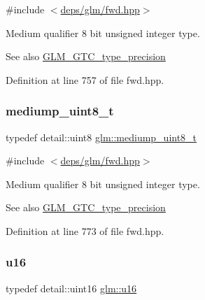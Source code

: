 {\ttfamily \#include $<$\hyperlink{fwd_8hpp}{deps/glm/fwd.\+hpp}$>$}

Medium qualifier 8 bit unsigned integer type. \begin{DoxySeeAlso}{See also}
\hyperlink{group__gtc__type__precision}{G\+L\+M\+\_\+\+G\+T\+C\+\_\+type\+\_\+precision} 
\end{DoxySeeAlso}


Definition at line 757 of file fwd.\+hpp.

\mbox{\label{group__gtc__type__precision_gadfa38f3c245d371c4b2079f1fd68928b}} 
\subsubsection{\texorpdfstring{mediump\+\_\+uint8\+\_\+t}{mediump\_uint8\_t}}
{\footnotesize\ttfamily typedef detail\+::uint8 \hyperlink{group__gtc__type__precision_gadfa38f3c245d371c4b2079f1fd68928b}{glm\+::mediump\+\_\+uint8\+\_\+t}}



{\ttfamily \#include $<$\hyperlink{fwd_8hpp}{deps/glm/fwd.\+hpp}$>$}

Medium qualifier 8 bit unsigned integer type. \begin{DoxySeeAlso}{See also}
\hyperlink{group__gtc__type__precision}{G\+L\+M\+\_\+\+G\+T\+C\+\_\+type\+\_\+precision} 
\end{DoxySeeAlso}


Definition at line 773 of file fwd.\+hpp.

\mbox{\label{group__gtc__type__precision_gae7a1571503f83d2264ddfa705a6b082a}} 
\subsubsection{\texorpdfstring{u16}{u16}}
{\footnotesize\ttfamily typedef detail\+::uint16 \hyperlink{group__gtc__type__precision_gae7a1571503f83d2264ddfa705a6b082a}{glm\+::u16}}



